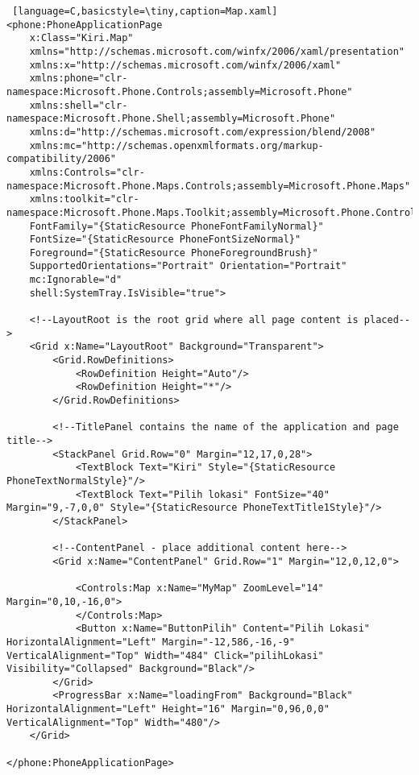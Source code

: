 \begin{lstlisting} [language=C,basicstyle=\tiny,caption=Map.xaml]
<phone:PhoneApplicationPage
    x:Class="Kiri.Map"
    xmlns="http://schemas.microsoft.com/winfx/2006/xaml/presentation"
    xmlns:x="http://schemas.microsoft.com/winfx/2006/xaml"
    xmlns:phone="clr-namespace:Microsoft.Phone.Controls;assembly=Microsoft.Phone"
    xmlns:shell="clr-namespace:Microsoft.Phone.Shell;assembly=Microsoft.Phone"
    xmlns:d="http://schemas.microsoft.com/expression/blend/2008"
    xmlns:mc="http://schemas.openxmlformats.org/markup-compatibility/2006"
    xmlns:Controls="clr-namespace:Microsoft.Phone.Maps.Controls;assembly=Microsoft.Phone.Maps"
    xmlns:toolkit="clr-namespace:Microsoft.Phone.Maps.Toolkit;assembly=Microsoft.Phone.Controls.Toolkit"
    FontFamily="{StaticResource PhoneFontFamilyNormal}"
    FontSize="{StaticResource PhoneFontSizeNormal}"
    Foreground="{StaticResource PhoneForegroundBrush}"
    SupportedOrientations="Portrait" Orientation="Portrait"
    mc:Ignorable="d"
    shell:SystemTray.IsVisible="true">

    <!--LayoutRoot is the root grid where all page content is placed-->
    <Grid x:Name="LayoutRoot" Background="Transparent">
        <Grid.RowDefinitions>
            <RowDefinition Height="Auto"/>
            <RowDefinition Height="*"/>
        </Grid.RowDefinitions>

        <!--TitlePanel contains the name of the application and page title-->
        <StackPanel Grid.Row="0" Margin="12,17,0,28">
            <TextBlock Text="Kiri" Style="{StaticResource PhoneTextNormalStyle}"/>
            <TextBlock Text="Pilih lokasi" FontSize="40" Margin="9,-7,0,0" Style="{StaticResource PhoneTextTitle1Style}"/>
        </StackPanel>

        <!--ContentPanel - place additional content here-->
        <Grid x:Name="ContentPanel" Grid.Row="1" Margin="12,0,12,0">

            <Controls:Map x:Name="MyMap" ZoomLevel="14" Margin="0,10,-16,0">
            </Controls:Map>
            <Button x:Name="ButtonPilih" Content="Pilih Lokasi" HorizontalAlignment="Left" Margin="-12,586,-16,-9" VerticalAlignment="Top" Width="484" Click="pilihLokasi" Visibility="Collapsed" Background="Black"/>
        </Grid>
        <ProgressBar x:Name="loadingFrom" Background="Black" HorizontalAlignment="Left" Height="16" Margin="0,96,0,0" VerticalAlignment="Top" Width="480"/>
    </Grid>

</phone:PhoneApplicationPage>
\end{lstlisting}